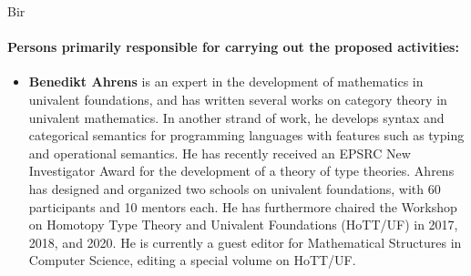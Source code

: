 \begin{sitedescription}{Bir}
\paragraph{Persons primarily responsible for carrying out the proposed activities:}

\begin{itemize}
 \item 
\textbf{Benedikt Ahrens} is an expert in the development of mathematics in univalent foundations, and has written several works on category theory in univalent mathematics.
In another strand of work, he develops syntax and categorical semantics for programming languages with features such as typing and operational semantics.
He has recently received an EPSRC New Investigator Award for the development of a theory of type theories.
Ahrens has designed and organized two schools on univalent foundations, with 60 participants and 10 mentors each. He has furthermore chaired the Workshop on Homotopy Type Theory and Univalent Foundations (HoTT/UF) in 2017, 2018, and 2020. He is currently a guest editor for Mathematical Structures in Computer Science, editing a special volume on HoTT/UF.
\end{itemize}






\end{sitedescription}

